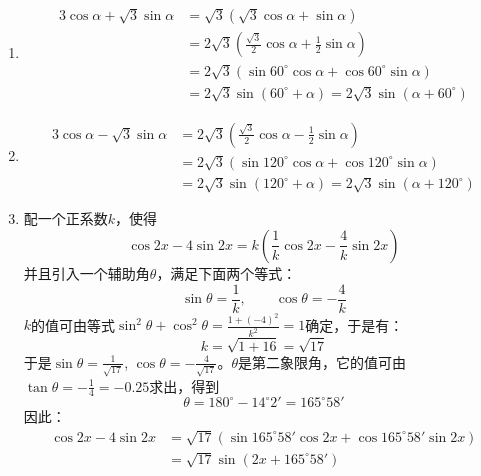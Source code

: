 \begin{solution}
\begin{enumerate}
    \item \[\begin{split}
3\cos\alpha+\sqrt{3}\sin\alpha &=\sqrt{3}\left(\sqrt{3}\cos\alpha+\sin\alpha\right)\\
&=2\sqrt{3}\left(\frac{\sqrt{3}}{2}\cos\alpha+\frac{1}{2}\sin\alpha\right)\\
&=2\sqrt{3}\left(\sin60^{\circ}\cos\alpha+\cos60^{\circ}\sin\alpha\right)\\
&=2\sqrt{3}\sin(60^{\circ}+\alpha)=2\sqrt{3}\sin (\alpha+60^{\circ})        
    \end{split}\]

    \begin{figure}[htp]
        \centering
        \caption{}
    \end{figure}

    \item \[\begin{split}
 3\cos\alpha-\sqrt{3}\sin\alpha&=2\sqrt{3}\left(\frac{\sqrt{3}}{2}\cos\alpha-\frac{1}{2}\sin\alpha\right)\\       
 &=2\sqrt{3}\left(\sin120^{\circ}\cos\alpha+\cos120^{\circ}\sin\alpha\right)\\
 &=2\sqrt{3}\sin(120^{\circ}+\alpha)=2\sqrt{3}\sin (\alpha+120^{\circ})      
    \end{split}\]
    \item 配一个正系数$k$，使得
\[\cos 2x-4\sin 2x=k\left(\frac{1}{k}\cos2x-\frac{4}{k}\sin 2x\right)\]    
    并且引入一个辅助角$\theta$，满足下面两个等式：
\[\sin\theta=\frac{1}{k},\qquad \cos\theta=-\frac{4}{k}\]
$k$的值可由等式$\sin^2\theta+\cos^2\theta=\frac{1+(-4)^2}{k^2}=1$确定，于是有：
\[k=\sqrt{1+16}=\sqrt{17}\]
于是$\sin\theta=\frac{1}{\sqrt{17}}$, $\cos\theta=-\frac{4}{\sqrt{17}}$。$\theta$是第二象限角，它的值可由$\tan\theta=-\frac{1}{4}=-0.25$求出，得到
\[\theta=180^{\circ}-14^{\circ}2'=165^{\circ}58'\]
因此：
    \[\begin{split}
 \cos 2x-4\sin 2x&=\sqrt{17}\left(\sin165^{\circ}58'\cos 2x+\cos165^{\circ}58'\sin2x \right)       \\
 &=\sqrt{17}\sin (2x+165^{\circ}58')
    \end{split}\]
\end{enumerate}     
\end{solution}

